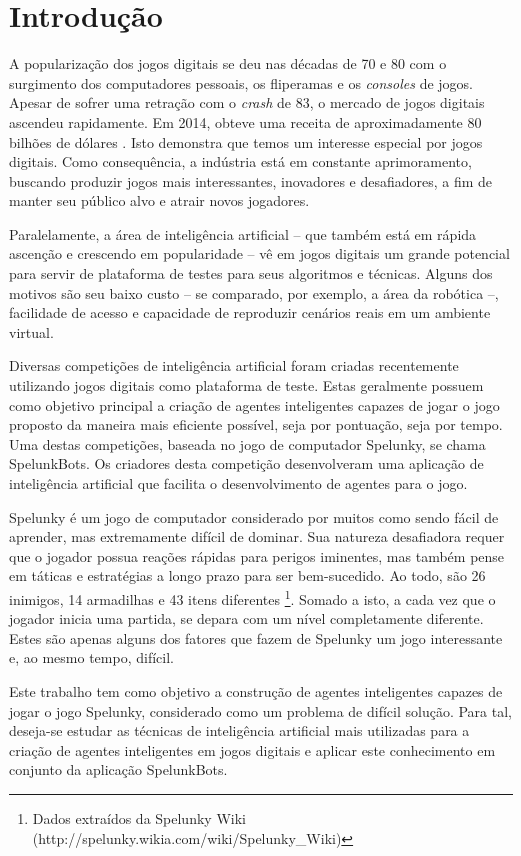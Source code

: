 \chapter{\label{chap:intro}Introdução}
A popularização dos jogos digitais se deu nas décadas de 70 e 80 com o
surgimento dos computadores pessoais, os fliperamas e os \textit{consoles}
de jogos. Apesar de sofrer uma retração com o \textit{crash} de 83, o mercado 
de jogos digitais ascendeu rapidamente. Em 2014, obteve uma receita de
aproximadamente 80 bilhões de dólares \cite{VIDEOGAMEREVENUE}. Isto demonstra
que temos um interesse especial por jogos digitais. Como consequência, a
indústria está em constante aprimoramento, buscando produzir jogos mais
interessantes, inovadores e desafiadores, a fim de manter seu público alvo e
atrair novos jogadores.

Paralelamente, a área de inteligência artificial -- que também está em rápida
ascenção e crescendo em popularidade -- vê em jogos digitais um grande
potencial para servir de plataforma de testes para seus algoritmos e técnicas.
Alguns dos motivos são seu baixo custo -- se comparado, por exemplo, a área da
robótica --, facilidade de acesso e capacidade de reproduzir cenários reais em
um ambiente virtual.

Diversas competições de inteligência artificial foram criadas recentemente
utilizando jogos digitais como plataforma de teste. Estas geralmente possuem
como objetivo principal a criação de agentes inteligentes capazes de jogar o
jogo proposto da maneira mais eficiente possível, seja por pontuação, seja por
tempo. Uma destas competições, baseada no jogo de computador Spelunky, se chama
SpelunkBots. Os criadores desta competição desenvolveram uma aplicação de
inteligência artificial que facilita o desenvolvimento de agentes para o jogo.

Spelunky é um jogo de computador considerado por muitos como sendo fácil de
aprender, mas extremamente difícil de dominar. Sua natureza desafiadora requer
que o jogador possua reações rápidas para perigos iminentes, mas também pense
em táticas e estratégias a longo prazo para ser bem-sucedido. Ao todo, são 26
inimigos, 14 armadilhas e 43 itens diferentes \footnote{Dados extraídos da
Spelunky Wiki (http://spelunky.wikia.com/wiki/Spelunky\_Wiki)}. Somado a isto, a
cada vez que o jogador inicia uma partida, se depara com um nível completamente
diferente. Estes são apenas alguns dos fatores que fazem de Spelunky um jogo
interessante e, ao mesmo tempo, difícil.

Este trabalho tem como objetivo a construção de agentes inteligentes capazes de
jogar o jogo Spelunky, considerado como um problema de difícil solução. Para
tal, deseja-se estudar as técnicas de inteligência artificial mais utilizadas
para a criação de agentes inteligentes em jogos digitais e aplicar este
conhecimento em conjunto da aplicação SpelunkBots.
